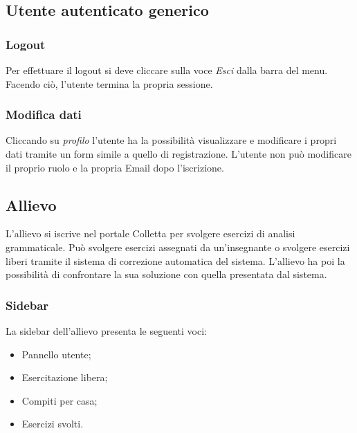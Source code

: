 \subsection{Utente autenticato generico}

    \subsubsection{Logout}
    Per effettuare il {logout} si deve cliccare sulla voce \textit{Esci} dalla barra del menu. Facendo ciò, l'utente termina la propria sessione.
    \subsubsection{Modifica dati}
    Cliccando su \textit{profilo} l'utente ha la possibilità visualizzare e modificare i propri dati tramite un form simile a quello di registrazione. L'utente non può modificare il proprio ruolo e la propria Email dopo l'iscrizione.

    \subsection{Allievo}
      L'allievo si iscrive nel portale Colletta per svolgere esercizi di analisi grammaticale. Può svolgere esercizi assegnati da un'insegnante o svolgere esercizi liberi tramite il sistema di correzione automatica del sistema. L'allievo ha poi la possibilità di confrontare la sua soluzione con quella presentata dal sistema.
        \subsubsection{Sidebar}
          La sidebar dell'allievo presenta le seguenti voci:
            \begin{itemize}
                \item Pannello utente;
                \item Esercitazione libera;
                \item Compiti per casa;
                \item Esercizi svolti.
            \end{itemize}
            

            
